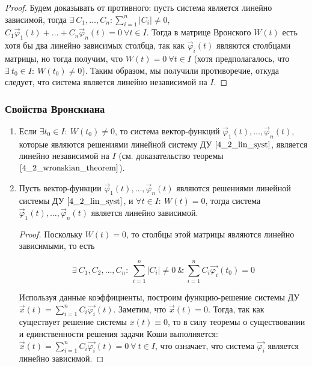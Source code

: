\begin{proof}
    Будем доказывать от противного: пусть система является линейно зависимой, тогда $\exists ~ C_1, \dots, C_n: \sum^n_{i = 1} |C_i| \neq 0$,
    $C_1 \overrightarrow \varphi_1(t) + \dots + C_n \overrightarrow \varphi_n(t) = 0 ~ \forall t \in I$. Тогда в матрице Вронского $W(t)$
    есть хотя бы два линейно зависимых столбца, так как $\overrightarrow \varphi_i(t)$ являются столбцами матрицы, но тогда получим, что
    $W(t) = 0 ~ \forall t \in I$ (хотя предполагалось, что $\exists ~ t_0 \in I : ~ W(t_0) \neq 0$). Таким образом, мы получили противоречие,
    откуда следует, что система является линейно независимой на $I$.
\end{proof}

\subsubsection{Свойства Вронскиана}
\label{wr_properties}

\begin{enumerate}
    \item Если $\exists t_0 \in I : ~ W(t_0) \neq 0$, то система вектор-функций $\overrightarrow \varphi_1(t), \dots, \overrightarrow \varphi_n(t)$, которые являются решениями линейной систему ДУ $\eqref{4_2_lin_syst}$, является линейно независимой на $I$ (см. доказательство теоремы $\eqref{4_2_wronskian_theorem}$).
    \item Пусть вектор-функции $\overrightarrow \varphi_1(t), \dots, \overrightarrow \varphi_n(t)$ являются решениями линейной системы ДУ $\eqref{4_2_lin_syst}$, и $\forall t \in I: ~ W(t) = 0$, тогда система $\overrightarrow \varphi_1(t), \dots, \overrightarrow \varphi_n(t)$ является линейно зависимой.

    \begin{proof}
        Поскольку $W(t) = 0$, то столбцы этой матрицы являются линейно зависимыми, то есть
        
        \[ \exists ~ C_1, C_2, \dots, C_n : ~ \sum_{i = 1}^n |C_i| \neq 0 ~ \& ~ \sum_{i = 1}^n C_i \overrightarrow{\varphi_i}(t_0) = 0 \]
        
        Используя данные коэффициенты, построим функцию-решение системы ДУ $\overrightarrow{x}(t) = \sum_{i = 1}^n C_i \overrightarrow{\varphi_i}(t)$. Заметим, что $\overrightarrow{x}(t) = 0$. Тогда, так как существует решение системы $x(t) \equiv 0$, то в силу теоремы о существовании и единственности решения задачи Коши выполняется: $\overrightarrow{x}(t) = \sum_{i = 1}^n C_i \overrightarrow{\varphi_i}(t) = 0 ~ \forall ~ t \in I$, что означает, что система $\overrightarrow{\varphi_i}$ является линейно зависимой.
    \end{proof}
    
\end{enumerate}
